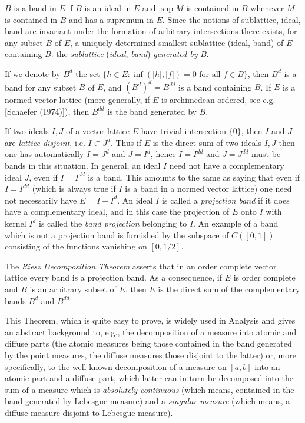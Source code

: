 \pagebreak

$ B $ is a band in $ E $ if $ B $ is an ideal in $ E $ and $ \sup M $ is contained in $ B $ whenever $ M $ is contained in $ B $ and has a supremum in $ E $.
Since the notions of sublattice, ideal, band are invariant under the formation of arbitrary intersections there exists, for any subset $ B $ of $ E $, a uniquely determined smallest sublattice (ideal, band) of $ E $ containing $ B $: the \emph{sublattice} (\emph{ideal}, \emph{band}) \emph{generated by} $ B $.

If we denote by $ B^{d} $ the set $ \{h \in E \colon \inf(|h|,|f|) = 0 \text{ for all } f \in B\} $, then $ B^{d} $ is a band for any subset $ B $ of $ E $, and $ (B^{d})^{d} = B^{dd} $ is a band containing $ B $.
If $ E $ is a normed vector lattice (more generally, if $ E $ is archimedean ordered, see e.g. [Schaefer (1974)]), then $ B^{dd} $ is the band generated by $ B $.

If two ideals $ I, J $ of a vector lattice $ E $ have trivial intersection $ \{0\} $, then $ I $ and $ J $ are \emph{lattice disjoint}, i.e. $ I \subset J^{d} $.
Thus if $ E $ is the direct sum of two ideals $ I, J $ then one has automatically $ I = J^{d} $ and $ J = I^{d} $, hence $ I = I^{dd} $ and $ J = J^{dd} $ must be bands in this situation.
In general, an ideal $ I $ need not have a complementary ideal $ J $, even if $ I = I^{dd} $ is a band.
This amounts to the same as saying that even if $ I = I^{dd} $ (which is always true if $ I $ is a band in a normed vector lattice) one need not necessarily have $ E = I + I^{d} $.
An ideal $ I $ is called a \emph{projection band} if it does have a complementary ideal, and in this case the projection of $ E $ onto $ I $ with kernel $ I^{d} $ is called the \emph{band projection} belonging to $ I $.
An example of a band which is not a projection band is furnished by the subspace of $ C([0,1]) $ consisting of the functions vanishing on $ [0,1/2] $.

The \emph{Riesz Decomposition Theorem} asserts that in an order complete vector lattice every band is a projection band.
As a consequence, if $ E $ is order complete and $ B $ is an arbitrary subset of $ E $, then $ E $ is the direct sum of the complementary bands $ B^{d} $ and $ B^{dd} $.

This Theorem, which is quite easy to prove, is widely used in Analysis and gives an abstract background to, e.g., the decomposition of a measure into atomic and diffuse parts (the atomic measures being those contained in the band generated by the point measures, the diffuse measures those disjoint to the latter) or, more specifically, to the well-known decomposition of a measure on $ [a,b] $ into an atomic part and a diffuse part, which latter can in turn be decomposed into the sum of a measure which is \emph{absolutely continuous} (which means, contained in the band generated by Lebesgue measure) and a \emph{singular measure} (which means, a diffuse measure disjoint to Lebesgue measure).


